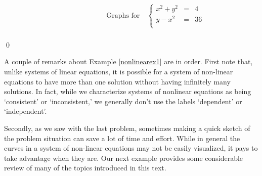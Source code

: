 \begin{ex}
\begin{enumerate}
\[\begin{array}{cc}
&

\hspace{1in}

\text{Graphs for} \quad \left\{\begin{array}{rcr}  x^2 +y^2 & = & 4 \\ y-x^2 & = & 36 \\ \end{array} \right. \\

\end{array} \]

\end{enumerate}

\qed

\end{ex}

A couple of remarks about Example \ref{nonlinearex1} are in order.  First note that, unlike systems of linear equations, it is possible for a system of non-linear equations to have more than one solution without having infinitely many solutions.  In fact, while we characterize systems of nonlinear equations as being `consistent' or `inconsistent,' we generally don't use the labels `dependent' or `independent'.  

Secondly, as we saw with the last problem, sometimes making a quick sketch of the problem situation can save a lot of time and effort.  While in general the curves in a system of non-linear equations may not be easily visualized, it pays to take advantage when they are.  Our next example provides some considerable review of many of the topics introduced in this text.

